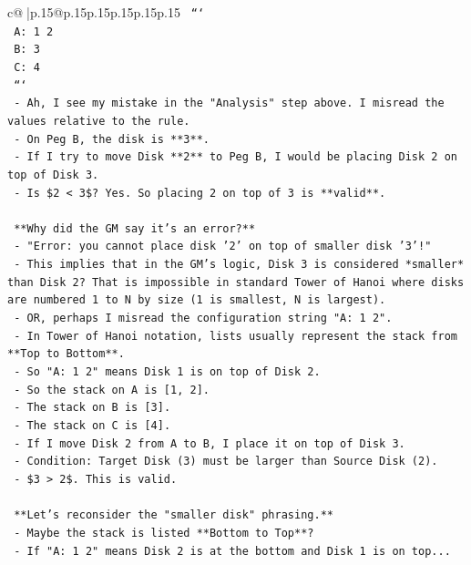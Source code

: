 \documentclass{article}
\begin{document}
{\begin{supertabular}{c@{$\;$}|p{.15\linewidth}@{}p{.15\linewidth}p{.15\linewidth}p{.15\linewidth}p{.15\linewidth}p{.15\linewidth}}
{{{\texttt{      ```} \\
\texttt{      A: 1 2 } \\
\texttt{      B: 3 } \\
\texttt{      C: 4 } \\
\texttt{      ```} \\
\texttt{    {-} Ah, I see my mistake in the "Analysis" step above. I misread the values relative to the rule.} \\
\texttt{    {-} On Peg B, the disk is **3**.} \\
\texttt{    {-} If I try to move Disk **2** to Peg B, I would be placing Disk 2 on top of Disk 3.} \\
\texttt{    {-} Is \$2 < 3\$? Yes. So placing 2 on top of 3 is **valid**.} \\
\\ 
\texttt{    **Why did the GM say it's an error?**} \\
\texttt{    {-} "Error: you cannot place disk '2' on top of smaller disk '3'!"} \\
\texttt{    {-} This implies that in the GM's logic, Disk 3 is considered *smaller* than Disk 2? That is impossible in standard Tower of Hanoi where disks are numbered 1 to N by size (1 is smallest, N is largest).} \\
\texttt{    {-} OR, perhaps I misread the configuration string "A: 1 2".} \\
\texttt{      {-} In Tower of Hanoi notation, lists usually represent the stack from **Top to Bottom**.} \\
\texttt{      {-} So "A: 1 2" means Disk 1 is on top of Disk 2.} \\
\texttt{      {-} So the stack on A is {[}1, 2{]}.} \\
\texttt{      {-} The stack on B is {[}3{]}.} \\
\texttt{      {-} The stack on C is {[}4{]}.} \\
\texttt{    {-} If I move Disk 2 from A to B, I place it on top of Disk 3.} \\
\texttt{    {-} Condition: Target Disk (3) must be larger than Source Disk (2).} \\
\texttt{    {-} \$3 > 2\$. This is valid.} \\
\\ 
\texttt{    **Let's reconsider the "smaller disk" phrasing.**} \\
\texttt{    {-} Maybe the stack is listed **Bottom to Top**?} \\
\texttt{      {-} If "A: 1 2" means Disk 2 is at the bottom and Disk 1 is on top...} \\
}}}
\end{supertabular}}
\end{document}
